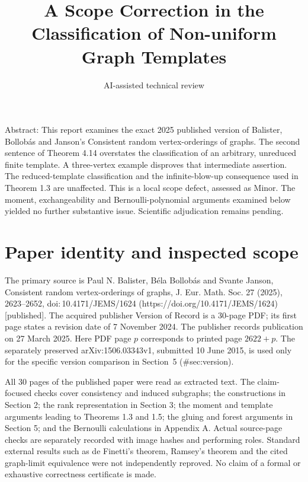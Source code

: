 \documentclass[10pt]{article}
\title{A Scope Correction in the Classification
of Non-uniform Graph Templates}
\author{AI-assisted technical review}
\date{}
\begin{document}
\maketitle
Abstract: This report examines the exact 2025 published version of Balister, Bollobás and Janson’s Consistent random vertex-orderings of graphs. The second sentence of Theorem 4.14 overstates the classification of an arbitrary, unreduced finite template. A three-vertex example disproves that intermediate assertion. The reduced-template classification and the infinite-blow-up consequence used in Theorem 1.3 are unaffected. This is a local scope defect, assessed as Minor. The moment, exchangeability and Bernoulli-polynomial arguments examined below yielded no further substantive issue. Scientific adjudication remains pending.\par
\section*{Paper identity and inspected scope}
The primary source is Paul N. Balister, Béla Bollobás and Svante Janson, Consistent random vertex-orderings of graphs, J. Eur. Math. Soc. 27 (2025), 2623–2652, doi: 10.4171/JEMS/1624 (https://doi.org/10.4171/JEMS/1624) [published]. The acquired publisher Version of Record is a 30-page PDF; its first page states a revision date of 7 November 2024. The publisher records publication on 27 March 2025. Here PDF page \(p\) corresponds to printed page \(2622+p\). The separately preserved arXiv:1506.03343v1, submitted 10 June 2015, is used only for the specific version comparison in Section 5 (\#sec:version).\par
All 30 pages of the published paper were read as extracted text. The claim-focused checks cover consistency and induced subgraphs; the constructions in Section 2; the rank representation in Section 3; the moment and template arguments leading to Theorems 1.3 and 1.5; the gluing and forest arguments in Section 5; and the Bernoulli calculations in Appendix A. Actual source-page checks are separately recorded with image hashes and performing roles. Standard external results such as de Finetti’s theorem, Ramsey’s theorem and the cited graph-limit equivalence were not independently reproved. No claim of a formal or exhaustive correctness certificate is made.\par
\end{document}
